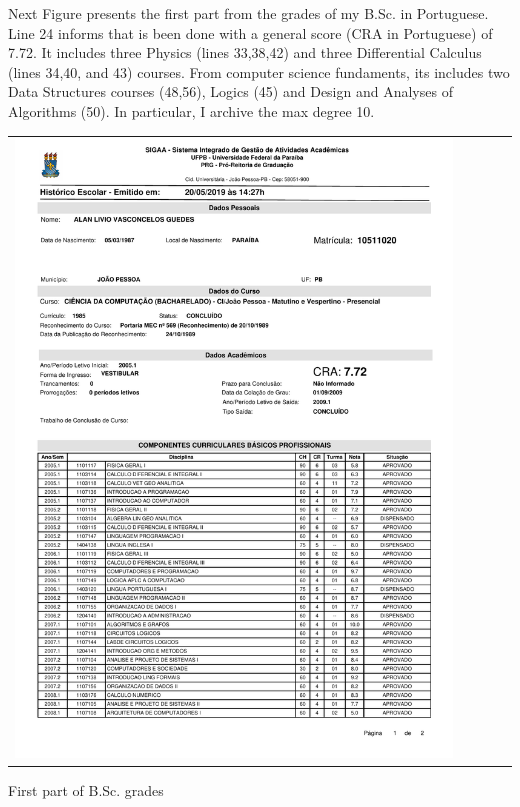 \documentclass[10pt,a4paper,sans,colorlinks]{moderncv}
\begin{document}
Next Figure presents the first part from the grades of my B.Sc. in Portuguese.
Line 24 informs that is been done with a general score (CRA in Portuguese) of 7.72.
It includes three Physics (lines 33,38,42) and three Differential Calculus (lines 34,40, and 43) courses.
From computer science fundaments, its includes two Data Structures courses (48,56), Logics (45) and  Design and Analyses of Algorithms (50).
In particular, I archive the max degree 10.
\vspace{2em}
\begin{Figure}
  \begin{tabularx}{\textwidth}{X p{1cm}}
    \includegraphics[align=t,width=0.92\textwidth, keepaspectratio, trim=0cm 0cm 0cm 2cm]{../static/certificates/bsc-grades.pdf}
  \end{tabularx}
  \caption{First part of B.Sc. grades}
\end{Figure}

\newpage
\end{document}
